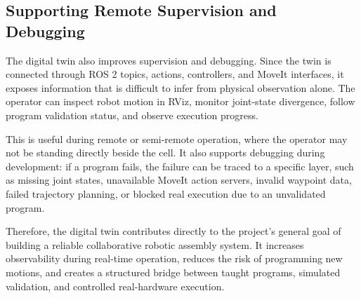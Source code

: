 \subsection{Supporting Remote Supervision and Debugging}

The digital twin also improves supervision and debugging. Since the twin is connected through ROS 2 topics, actions, controllers, and MoveIt interfaces, it exposes information that is difficult to infer from physical observation alone. The operator can inspect robot motion in RViz, monitor joint-state divergence, follow program validation status, and observe execution progress.

This is useful during remote or semi-remote operation, where the operator may not be standing directly beside the cell. It also supports debugging during development: if a program fails, the failure can be traced to a specific layer, such as missing joint states, unavailable MoveIt action servers, invalid waypoint data, failed trajectory planning, or blocked real execution due to an unvalidated program.

Therefore, the digital twin contributes directly to the project's general goal of building a reliable collaborative robotic assembly system. It increases observability during real-time operation, reduces the risk of programming new motions, and creates a structured bridge between taught programs, simulated validation, and controlled real-hardware execution.
